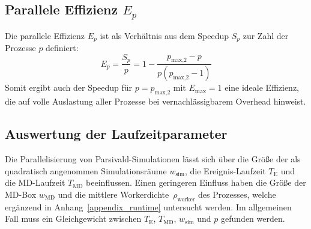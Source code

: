 \subsection{Parallele Effizienz $E_p$}

Die parallele Effizienz $E_p$ ist als Verhältnis aus dem Speedup $S_p$ zur Zahl der Prozesse $p$ definiert:
\begin{equation}
  E_p = \frac{S_p}{p} = 1 - \frac{p_\text{max,2} - p}{p (p_\text{max,2} - 1)}
\end{equation}
Somit ergibt auch der Speedup für $p = p_\text{max,2}$ mit $E_\text{max} = 1$ eine ideale Effizienz, die auf volle Auslastung aller Prozesse bei vernachlässigbarem Overhead hinweist.



\subsection{Auswertung der Laufzeitparameter}

Die Parallelisierung von Parsivald-Simulationen lässt sich über die Größe der als quadratisch angenommen Simulationsräume $w_\text{sim}$, die Ereignis-Laufzeit $T_\text{E}$ und die MD-Laufzeit $T_\text{MD}$ beeinflussen.
Einen geringeren Einfluss haben die Größe der MD-Box $w_\text{MD}$ und die mittlere Workerdichte~$\rho_\text{worker}$ des Prozesses, welche ergänzend in Anhang~\ref{appendix_runtime} untersucht werden.
Im allgemeinen Fall muss ein Gleichgewicht zwischen $T_\text{E}$, $T_\text{MD}$, $w_\text{sim}$ und $p$ gefunden werden.

